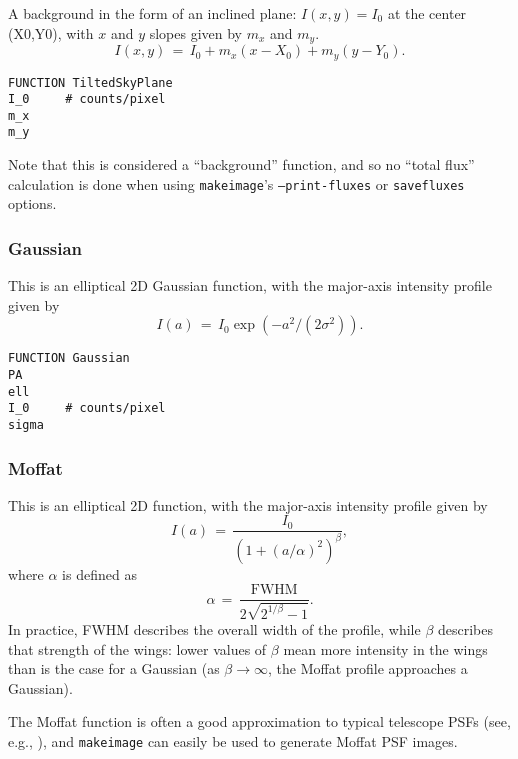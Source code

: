 \documentclass[10pt,a4paper,article]{memoir}
\newcommand{\makeimage}{\texttt{makeimage}}
\begin{document}
A background in the form of an inclined plane: $I(x,y) = I_0$ at the center
(X0,Y0), with $x$ and $y$ slopes given by $m_x$ and $m_y$.
\begin{equation}
I(x,y) \, = \, I_{0} + m_{x} (x - X_{0}) + m_{y} (y - Y_{0}).
\end{equation}

\begin{verbatim}
FUNCTION TiltedSkyPlane
I_0     # counts/pixel
m_x
m_y
\end{verbatim}

Note that this is considered a ``background'' function, and so no ``total flux''
calculation is done when using \texttt{makeimage}'s \texttt{--print-fluxes} or
\texttt{savefluxes} options.


\subsubsection{Gaussian}

This is an elliptical 2D Gaussian function, with the major-axis intensity
profile given by
\begin{equation}
I(a) \, = \, I_{0} \exp(-a^2/(2 \sigma^2)).
\end{equation}

\begin{verbatim}
FUNCTION Gaussian
PA
ell
I_0     # counts/pixel
sigma
\end{verbatim}


\subsubsection{Moffat}

This is an elliptical 2D \citet{moffat69} function, with the major-axis intensity profile
given by
\begin{equation}
I(a) \, = \, \frac{I_{0}  }{(1 + (a/\alpha)^{2})^{\beta} },
\end{equation}
where $\alpha$ is defined as
\begin{equation}
\alpha \, = \, \frac{ {\mathrm{FWHM}}}{2 \sqrt{2^{1/\beta} - 1}}.
\end{equation}
In practice, FWHM describes the overall width of the profile, while $\beta$ describes that
strength of the wings: lower values of $\beta$ mean more intensity in the wings
than is the case for a Gaussian (as $\beta \rightarrow \infty$, the Moffat profile
approaches a Gaussian).

The Moffat function is often a good approximation to typical telescope PSFs (see, e.g.,
\citealt{trujillo01}), and \makeimage{} can easily be used to generate Moffat PSF images.
\end{document}
